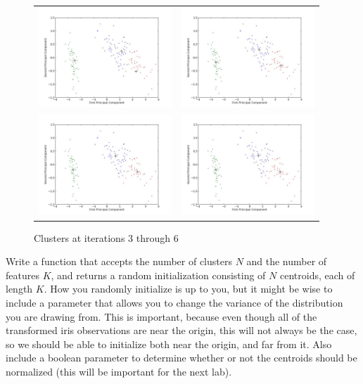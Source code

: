 \begin{figure}
	\centering
	\begin{tabular}{cc}
	\includegraphics[width=5cm]{iteration3.jpg} &  \includegraphics[width=5cm]{iteration4.jpg} \\
	\includegraphics[width=5cm]{iteration5.jpg} & \includegraphics[width=5cm]{iteration6.jpg}
	\end{tabular}
	\caption{Clusters at iterations 3 through 6}
\end{figure}

\begin{problem}
Write a function that accepts the number of clusters $N$ and the number of features $K$, and returns a random initialization consisting of $N$ centroids, each of length $K$. How you randomly initialize is up to you, but it might be wise to include a parameter that allows you to change the variance of the distribution you are drawing from. This is important, because even though all of the transformed iris observations are near the origin, this will not always be the case, so we should be able to initialize both near the origin, and far from it. Also include a boolean parameter to determine whether or not the centroids should be normalized (this will be important for the next lab).
\end{problem}

